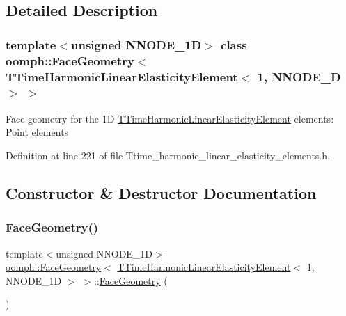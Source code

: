 \subsection{Detailed Description}
\subsubsection*{template$<$unsigned N\+N\+O\+D\+E\+\_\+1D$>$\newline
class oomph\+::\+Face\+Geometry$<$ T\+Time\+Harmonic\+Linear\+Elasticity\+Element$<$ 1, N\+N\+O\+D\+E\+\_\+D $>$ $>$}

Face geometry for the 1D \hyperlink{classoomph_1_1TTimeHarmonicLinearElasticityElement}{T\+Time\+Harmonic\+Linear\+Elasticity\+Element} elements\+: Point elements 

Definition at line 221 of file Ttime\+\_\+harmonic\+\_\+linear\+\_\+elasticity\+\_\+elements.\+h.



\subsection{Constructor \& Destructor Documentation}
\mbox{\label{classoomph_1_1FaceGeometry_3_01TTimeHarmonicLinearElasticityElement_3_011_00_01NNODE__1D_01_4_01_4_a3d91fb2e278052fa0009413edff47d9c}} 
\subsubsection{\texorpdfstring{Face\+Geometry()}{FaceGeometry()}}
{\footnotesize\ttfamily template$<$unsigned N\+N\+O\+D\+E\+\_\+1D$>$ \\
\hyperlink{classoomph_1_1FaceGeometry}{oomph\+::\+Face\+Geometry}$<$ \hyperlink{classoomph_1_1TTimeHarmonicLinearElasticityElement}{T\+Time\+Harmonic\+Linear\+Elasticity\+Element}$<$ 1, N\+N\+O\+D\+E\+\_\+1D $>$ $>$\+::\hyperlink{classoomph_1_1FaceGeometry}{Face\+Geometry} (\begin{DoxyParamCaption}{ }\end{DoxyParamCaption})\hspace{0.3cm}{\ttfamily [inline]}}



